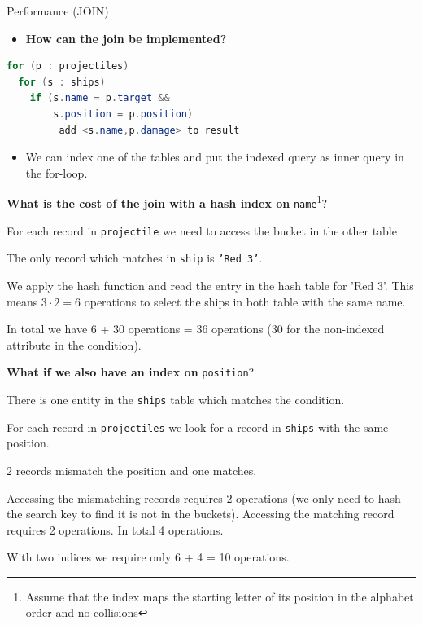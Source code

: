 \documentclass{beamer}
\begin{document}
\begin{frame}[fragile]{Performance (JOIN)}
\begin{itemize}
\item \textbf{How can the join be implemented?}
\pause
\end{itemize}
\begin{lstlisting}[language = Java]
for (p : projectiles)
  for (s : ships)
    if (s.name = p.target &&
        s.position = p.position)
         add <s.name,p.damage> to result
\end{lstlisting}
\begin{itemize}
\item We can index one of the tables and put the indexed query as inner query in the for-loop.
\end{itemize}
\end{frame}

\begin{slide}{
\item \textbf{What is the cost of the join with a hash index on} \texttt{name}\footnote{Assume that the index maps the starting letter of its position in the alphabet order and no collisions}?
\pause
\item For each record in \texttt{projectile} we need to access the bucket in the other table
\item The only record which matches in \texttt{ship} is \texttt{'Red 3'}.
\item We apply the hash function and read the entry in the hash table for 'Red 3'. This means $3 \cdot 2 = 6$ operations to select the ships in both table with the same name.
\item In total we have 6 + 30 operations = 36 operations (30 for the non-indexed attribute in the condition).
}\end{slide}

\begin{slide}{
\item \textbf{What if we also have an index on} \texttt{position}?
\pause
\item There is one entity in the \texttt{ships} table which matches the condition.
\item For each record in \texttt{projectiles} we look for a record in \texttt{ships} with the same position.
\item 2 records mismatch the position and one matches.
\item Accessing the mismatching records requires 2 operations (we only need to hash the search key to find it is not in the buckets). Accessing the matching record requires 2 operations. In total 4 operations.
\item With two indices we require only 6 + 4 = 10 operations.
}\end{slide}
\end{document}
